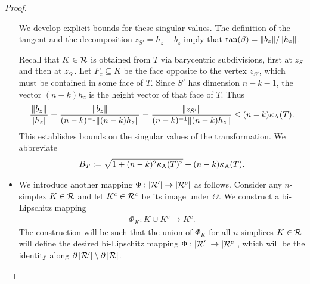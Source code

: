 \documentclass[10pt,a4paper]{article}
\begin{document}
\begin{proof}
\begin{itemize}
        We develop explicit bounds for these singular values. 
        The definition of the tangent and the decomposition $z_{S'} = h_{z} + b_{z}$ 
        imply that $\tan(\beta) = \|  b_{z}  \| / \|  h_{z}  \|$.
        
        Recall that $K \in {\mathcal R}$ is obtained from $T$ via barycentric subdivisions, first at $z_{S}$ and then at $z_{S'}$. 
        Let $F_{z} \subseteq K$ be the face opposite to the vertex $z_{S'}$,
        which must be contained in some face of $T$. 
        Since $S'$ has dimension $n-k-1$, the vector $(n-k) h_{z}$ is the height vector of that face of $T$. 
        Thus 
        \begin{align*}
            \frac{ \|  b_{z}  \| }{ \|  h_{z}  \| }
            = 
            \frac{ \|  b_{z}  \| }{ (n-k)^{-1} \| (n-k) h_{z} \| }
            = 
            \frac{ \|  z_{S'}  \| }{ (n-k)^{-1} \| (n-k) h_{z} \| }
            \leq 
            (n-k) \kappa_{\rm A}(T)
            .
        \end{align*}
        This establishes bounds on the singular values of the transformation. 
        We abbreviate 
        \begin{align*}
            B_{T} 
            := 
            \sqrt{ 
                1 + (n-k)^{2} \aspectratio(T)^{2} %
            } 
            + 
            (n-k) \aspectratio(T) %
            .
        \end{align*}
        
        
        \item 
        We introduce another mapping $\Phi : \left| {\mathcal R}' \right| \rightarrow \left| {\mathcal R}^{c} \right|$ as follows. 
        Consider any $n$-simplex $K \in {\mathcal R}$ and let $K^c \in {\mathcal R}^{c}$ be its image under $\Theta$.
        We construct a bi-Lipschitz mapping 
        \begin{align*}
            \Phi_{K} : K \cup K^{c} \rightarrow K^{c}.
        \end{align*}
        The construction will be such that the union of $\Phi_{K}$ for all $n$-simplices $K \in {\mathcal R}$
        will define the desired bi-Lipschitz mapping $\Phi : \left| {\mathcal R}' \right| \rightarrow \left| {\mathcal R}^{c} \right|$,
        which will be the identity along $\partial\left| {\mathcal R}' \right| \setminus \partial\left| {\mathcal R} \right|$.
        

\end{itemize}
\end{proof}
\end{document}
